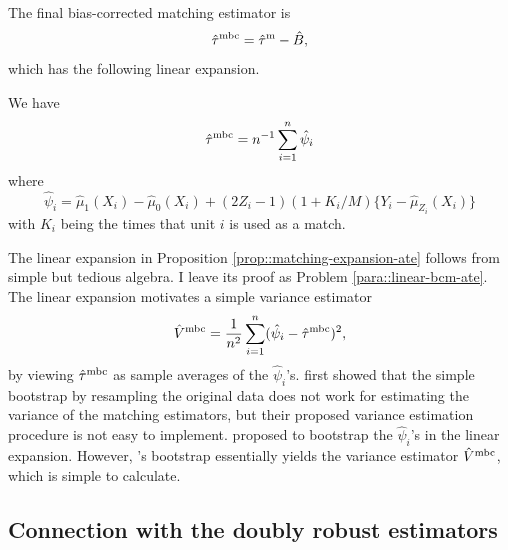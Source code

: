 The final bias-corrected matching estimator is
$$
\hat{\tau}^\textup{mbc} = \hat{\tau}^\textup{m}  - \hat{B},
$$
 which has the following linear expansion.
 
 \begin{proposition}
 \label{prop::matching-expansion-ate} We have 
 \begin{eqnarray}\label{eq::linearATE}
\hat{\tau}^\textup{mbc}  
= n^{-1} \sumn \hat{\psi}_i
\end{eqnarray} 
where 
 $$
  \hat{\psi}_i = \hat{\mu}_1(X_i) -  \hat{\mu}_0(X_i) + (2Z_i - 1) (1+K_i/M) \{   Y_i - \hat{\mu}_{Z_i}(X_i)  \}
 $$
 with $K_i$ being the times that unit $i$ is used as a match. 
 \end{proposition}
 
 
 
The linear expansion in Proposition  \ref{prop::matching-expansion-ate} follows from simple but tedious algebra. I leave its proof as Problem \ref{para::linear-bcm-ate}. The linear expansion motivates a simple variance estimator 
$$
\hat{V}^\textup{mbc}  = \frac{1}{n^2} \sum_{i=1}^n (  \hat{\psi}_i - \hat{\tau}^\textup{mbc}  )^2,
$$
by viewing $\hat{\tau}^\textup{mbc}  $ as sample averages of the $  \hat{\psi}_i $'s.  \citet{abadie2008failure}  first showed that the simple bootstrap by resampling the original data does not work for estimating the variance of the matching estimators, but their proposed variance estimation procedure is not easy to implement.  \citet{otsu2017bootstrap} proposed to bootstrap the $  \hat{\psi}_i $'s in the linear expansion. However,  \citet{otsu2017bootstrap}'s bootstrap essentially yields the variance estimator $\hat{V}^\textup{mbc}  $, which is simple to calculate. 


 
\subsection{Connection with the doubly robust estimators}
 \label{sec::connection-dr-att}
 
